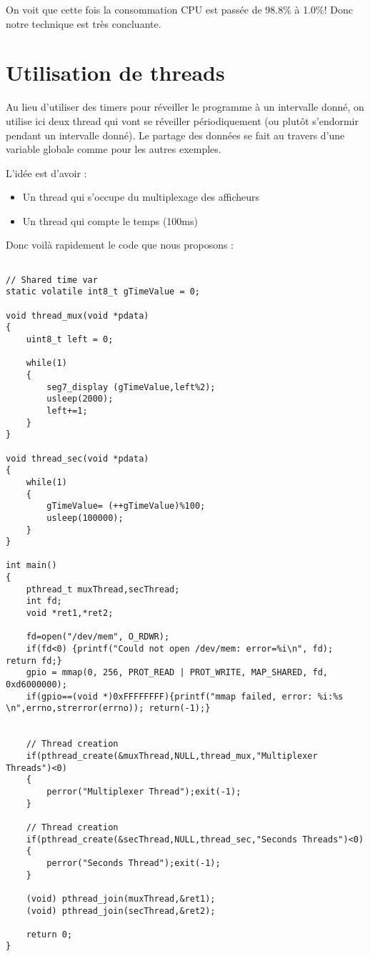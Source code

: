 On voit que cette fois la consommation CPU est passée de 98.8\% à 1.0\%! Donc notre technique est très concluante.

\newpage\section{Utilisation de threads}
Au lieu d'utiliser des timers pour réveiller le programme à un intervalle donné, on utilise ici deux thread qui vont se réveiller périodiquement (ou plutôt s'endormir pendant un intervalle donné). Le partage des données se fait au travers d'une variable globale comme pour les autres exemples. 

L'idée est d'avoir :
\begin{itemize}
\item Un thread qui s'occupe du multiplexage des afficheurs
\item Un thread qui compte le temps (100ms)\\
\end{itemize}

Donc voilà rapidement le code que nous proposons :
 
\begin{lstlisting}[frame=single,style=C]  % Start your code-block

// Shared time var
static volatile int8_t gTimeValue = 0;

void thread_mux(void *pdata)
{
	uint8_t left = 0;

	while(1)
	{
		seg7_display (gTimeValue,left%2);
		usleep(2000);
		left+=1;
	}
}

void thread_sec(void *pdata)
{
	while(1)
	{
		gTimeValue= (++gTimeValue)%100;
		usleep(100000);
	}
}	

int main()
{
	pthread_t muxThread,secThread;
	int fd;
	void *ret1,*ret2;

	fd=open("/dev/mem", O_RDWR);
	if(fd<0) {printf("Could not open /dev/mem: error=%i\n", fd); return fd;}
	gpio = mmap(0, 256, PROT_READ | PROT_WRITE, MAP_SHARED, fd, 0xd6000000);
	if(gpio==(void *)0xFFFFFFFF){printf("mmap failed, error: %i:%s \n",errno,strerror(errno)); return(-1);}
	

	// Thread creation
	if(pthread_create(&muxThread,NULL,thread_mux,"Multiplexer Threads")<0)
	{
		perror("Multiplexer Thread");exit(-1);
	}

	// Thread creation
	if(pthread_create(&secThread,NULL,thread_sec,"Seconds Threads")<0)
	{
		perror("Seconds Thread");exit(-1);
	}

	(void) pthread_join(muxThread,&ret1);
	(void) pthread_join(secThread,&ret2);

	return 0;
}
\end{lstlisting}

